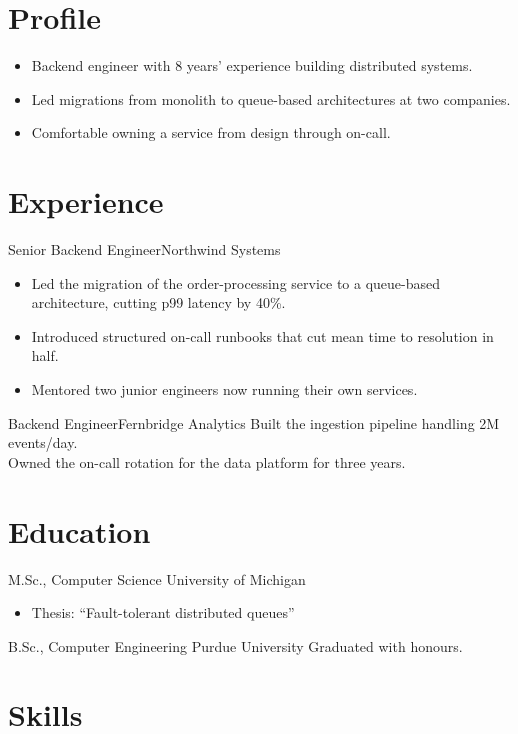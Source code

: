 \documentclass[a4paper, 11pt]{letter}
\begin{document}
\contact


\section{Profile}

\begin{itemize}
    \item Backend engineer with 8 years' experience building distributed systems.
    \item Led migrations from monolith to queue-based architectures at two companies.
    \item Comfortable owning a service from design through on-call.
\end{itemize}


\section{Experience}

{Senior Backend Engineer}{Northwind Systems}{
\begin{itemize}
    \item Led the migration of the order-processing service to a queue-based architecture, cutting p99 latency by 40\%.
    \item Introduced structured on-call runbooks that cut mean time to resolution in half.
    \item Mentored two junior engineers now running their own services.
\end{itemize}
}

{Backend Engineer}{Fernbridge Analytics}{
Built the ingestion pipeline handling 2M events/day.\\
Owned the on-call rotation for the data platform for three years.
}


\section{Education}

{M.Sc., Computer Science}
{University of Michigan}
{\begin{itemize}
    \item Thesis: ``Fault-tolerant distributed queues''
\end{itemize}
}

{B.Sc., Computer Engineering}
{Purdue University}
{Graduated with honours.
}


\section{Skills}
\end{document}
